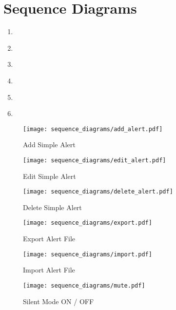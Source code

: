 \chapter{Sequence Diagrams}\label{ch:sequence_diagrams}

\begin{enumerate}
    \item~
    \item~
    \item~
    \item~
    \item~
    \item~
\end{enumerate}

\begin{figure}[]
	\centering
    \caption{Add Simple Alert}\label{fig:add_simple_alert}
    \texttt{[image: sequence\_diagrams/add\_alert.pdf]}
\end{figure}

\begin{figure}[]
	\centering
    \caption{Edit Simple Alert}\label{fig:edit_simple_alert}
    \texttt{[image: sequence\_diagrams/edit\_alert.pdf]}
\end{figure}

\begin{figure}[]
	\centering
    \caption{Delete Simple Alert}\label{fig:delete_simple_alert}
    \texttt{[image: sequence\_diagrams/delete\_alert.pdf]}
\end{figure}

\begin{figure}[]
	\centering
    \caption{Export Alert File}\label{fig:export_alert_file}
    \texttt{[image: sequence\_diagrams/export.pdf]}
\end{figure}

\begin{figure}[]
	\centering
    \caption{Import Alert File}\label{fig:import_alert_file}
    \texttt{[image: sequence\_diagrams/import.pdf]}
\end{figure}

\begin{figure}[]
	\centering
    \caption{Silent Mode ON / OFF}\label{fig:silent_mode}
	\texttt{[image: sequence\_diagrams/mute.pdf]}
\end{figure}
